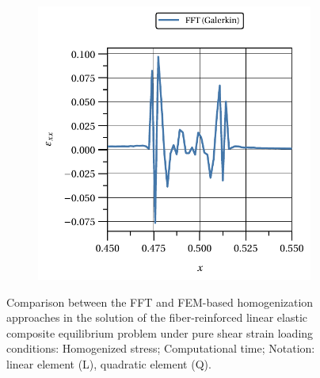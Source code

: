 \begin{figure}[hbt]
\begin{subfigure}[b]{0.49\textwidth}
      \includegraphics[width=\textwidth]{figures/linear_2D_ratio_-4_normal_strain_11_particle_2}
      \caption{}
      \label{subfig:linear_2D_ratio_-4_normal_strain_11_particle_2}
    \end{subfigure}
  \caption{Comparison between the FFT and FEM-based homogenization approaches in the solution
  of the fiber-reinforced linear elastic composite equilibrium problem under pure shear strain
  loading conditions:  Homogenized
  stress;  Computational time;
  Notation: linear element (L), quadratic element (Q).}
\label{fig:linear_2D_ratio_-4_normal_strain_11_particles}
\end{figure}

